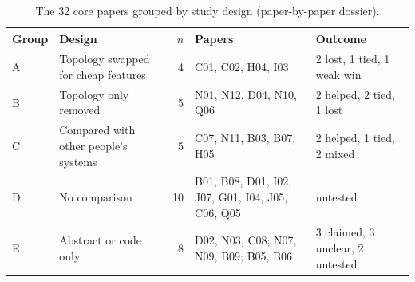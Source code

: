 \begin{table}[ht]
\centering\small
\caption{The 32 core papers grouped by study design (paper-by-paper dossier).}
\label{tab:outcomes}
\begin{tabularx}{\linewidth}{@{}lL{3.5cm}rYL{3.2cm}@{}}
\toprule
Group & Design & $n$ & Papers & Outcome \\
\midrule
A & Topology swapped for cheap features & 4 & C01, C02, H04, I03 & 2 lost, 1 tied, 1 weak win \\
B & Topology only removed & 5 & N01, N12, D04, N10, Q06 & 2 helped, 2 tied, 1 lost \\
C & Compared with other people's systems & 5 & C07, N11, B03, B07, H05 & 2 helped, 1 tied, 2 mixed \\
D & No comparison & 10 & B01, B08, D01, I02, J07, G01, I04, J05, C06, Q05 & untested \\
E & Abstract or code only & 8 & D02, N03, C08; N07, N09, B09; B05, B06 & 3 claimed, 3 unclear, 2 untested \\
\bottomrule
\end{tabularx}
\end{table}

